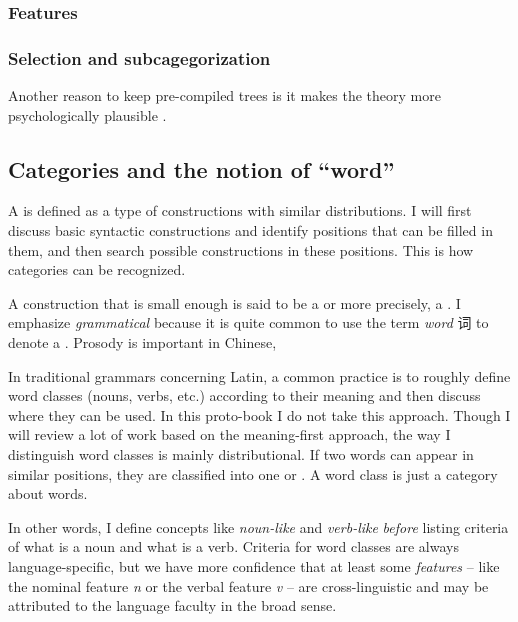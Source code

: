 \documentclass[../main.tex]{subfiles}
\begin{document}
\subsubsection{Features}

\subsubsection{Selection and subcagegorization}

Another reason to keep pre-compiled trees is it makes the theory more psychologically plausible \citep{brain-syntax-1,brain-syntax-2}.

\subsection{Categories and the notion of ``word''}

A  is defined as a type of constructions with similar distributions.
I will first discuss basic syntactic constructions and identify positions that can be filled in them, 
and then search possible constructions in these positions. This is how categories can be recognized.

A construction that is small enough is said to be a  or more precisely, 
a .
I emphasize \emph{grammatical} because it is quite common to use the term \emph{word} 词 to denote 
a . Prosody is important in Chinese, %

In traditional grammars concerning Latin, a common practice is to roughly define word classes (nouns, verbs, etc.) 
according to their meaning and then discuss where they can be used. 
In this proto-book I do not take this approach. Though I will review a lot of work based on the meaning-first 
approach, the way I distinguish word classes is mainly distributional. If two words can appear in similar
positions, they are classified into one  or .
A word class is just a category about words.  

In other words, I define concepts like \emph{noun-like} and \emph{verb-like} \emph{before} listing criteria of 
what is a noun and what is a verb. Criteria for word classes are always language-specific, but we have more 
confidence that at least some \emph{features} -- like the nominal feature \textit{n} or the verbal feature 
\textit{v} -- are cross-linguistic and may be attributed to the language faculty in the broad sense. 
\end{document}
